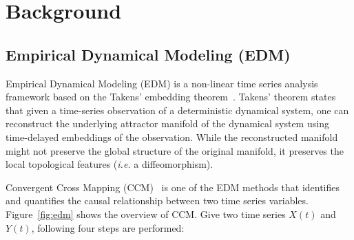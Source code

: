 \documentclass[sigconf]{acmart}
\begin{document}
\section{Background}\label{sec:background}

\subsection{Empirical Dynamical Modeling (EDM)}\label{sec:edm}

Empirical Dynamical Modeling (EDM) is a non-linear time series analysis
framework based on the Takens' embedding theorem~\cite{Deyle2011}. Takens'
theorem states that given a time-series observation of a deterministic
dynamical system, one can reconstruct the underlying attractor manifold of the
dynamical system using time-delayed embeddings of the observation. While the
reconstructed manifold might not preserve the global structure of the original
manifold, it preserves the local topological features (\textit{i.e.} a
diffeomorphism).

Convergent Cross Mapping (CCM)~\cite{Sugihara2012,Natsukawa2017,VanBerkel2020}
is one of the EDM methods that identifies and quantifies the causal
relationship between two time series variables. Figure~\ref{fig:edm} shows the
overview of CCM\@. Give two time series $X(t)$ and $Y(t)$, following four
steps are performed:
\end{document}
